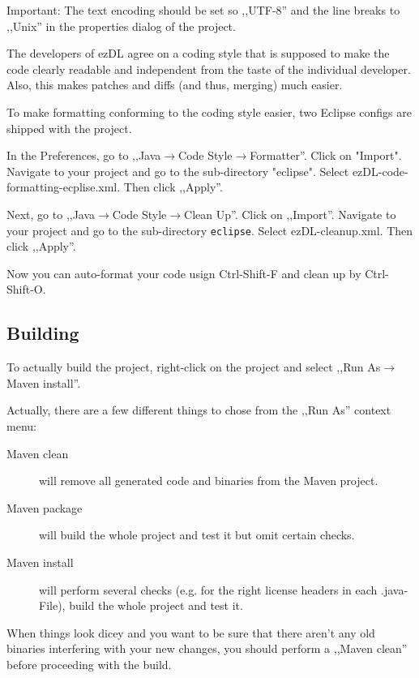 \documentclass[12pt]{book}
\begin{document}
Important: The text encoding should be set so ,,UTF-8'' and the line breaks to ,,Unix'' in the properties dialog of the project.

The developers of ezDL agree on a coding style that is supposed to make the code clearly readable and independent from the taste of the individual developer. Also, this makes patches and diffs (and thus, merging) much easier.

To make formatting conforming to the coding style easier, two Eclipse configs are shipped with the project.

In the Preferences, go to ,,Java$\rightarrow$Code Style$\rightarrow$Formatter''. Click on "Import". Navigate to your project and go to the sub-directory "eclipse". Select {{{ezDL-code-formatting-ecplise.xml}}}. Then click ,,Apply''.

Next, go to ,,Java$\rightarrow$Code Style$\rightarrow$Clean Up''. Click on ,,Import''. Navigate to your project and go to the sub-directory {\tt eclipse}. Select {{{ezDL-cleanup.xml}}}. Then click ,,Apply''.

Now you can auto-format your code usign Ctrl-Shift-F and clean up by Ctrl-Shift-O.



\subsection{Building \label{sec:build-eclipse}}

To actually build the project, right-click on the project and select ,,Run As$\rightarrow$Maven install''.

Actually, there are a few different things to chose from the ,,Run As'' context menu:

\begin{description}
\item[Maven clean] will remove all generated code and binaries from the Maven project.
\item[Maven package] will build the whole project and test it but omit certain checks.
\item[Maven install] will perform several checks (e.g. for the right license headers in each .java-File), build the whole project and test it.
\end{description}

When things look dicey and you want to be sure that there aren't any old binaries interfering with your new changes, you should perform a ,,Maven clean'' before proceeding with the build.
\end{document}
